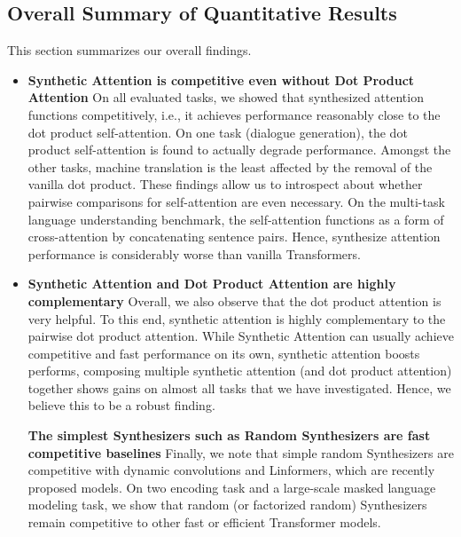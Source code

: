 \documentclass{article} \usepackage{iclr2021_conference,times}
\begin{document}
\subsection{Overall Summary of Quantitative Results}
This section summarizes our overall findings.
\begin{itemize}
    \item \textbf{Synthetic Attention is competitive even without Dot Product Attention} On all evaluated tasks, we showed that synthesized attention functions competitively, i.e., it achieves performance reasonably close to the dot product self-attention. On one task (dialogue generation), the dot product self-attention is found to actually degrade performance. Amongst the other tasks, machine translation is the least affected by the removal of the vanilla dot product. These findings allow us to introspect about whether pairwise comparisons for self-attention are even necessary. On the multi-task language understanding benchmark, the self-attention functions as a form of cross-attention by concatenating sentence pairs. Hence, synthesize attention performance is considerably worse than vanilla Transformers. 
    \item \textbf{Synthetic Attention and Dot Product Attention are highly complementary} Overall, we also observe that the dot product attention is very helpful. To this end, synthetic attention is highly complementary to the pairwise dot product attention. While Synthetic Attention can usually achieve competitive and fast performance on its own,  synthetic attention boosts performs, composing multiple synthetic attention (and dot product attention) together shows gains on almost all tasks that we have investigated. Hence, we believe this to be a robust finding. 
    
\textbf{The simplest Synthesizers such as Random Synthesizers are fast competitive baselines} Finally, we note that simple random Synthesizers are competitive with dynamic convolutions and Linformers, which are recently proposed models. On two encoding task and a large-scale masked language modeling task, we show that random (or factorized random) Synthesizers remain competitive to other fast or efficient Transformer models.
\end{itemize}
\end{document}
